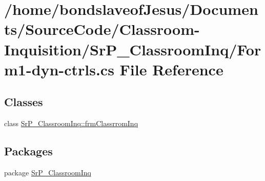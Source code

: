 \hypertarget{_form1-dyn-ctrls_8cs}{
\section{/home/bondslaveof\-Jesus/\-Documents/\-Source\-Code/\-Classroom-\/\-Inquisition/\-Sr\-P\-\_\-\-Classroom\-Inq/\-Form1-\/dyn-\/ctrls.cs \-File \-Reference}
\label{_form1-dyn-ctrls_8cs}
}
\subsection*{\-Classes}
\begin{DoxyCompactItemize}
\item 
class \hyperlink{class_sr_p___classroom_inq_1_1frm_classrrom_inq}{\-Sr\-P\-\_\-\-Classroom\-Inq\-::frm\-Classrrom\-Inq}
\end{DoxyCompactItemize}
\subsection*{\-Packages}
\begin{DoxyCompactItemize}
\item 
package \hyperlink{namespace_sr_p___classroom_inq}{\-Sr\-P\-\_\-\-Classroom\-Inq}
\end{DoxyCompactItemize}
